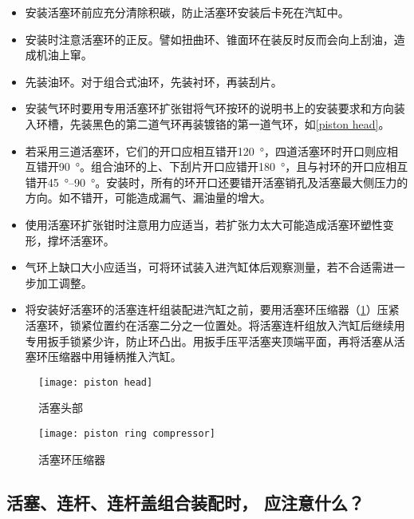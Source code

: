 \documentclass[UTF8]{ctexart}
\numberwithin{figure}{section}
\numberwithin{table}{section}
\begin{document}
\begin{itemize}
	\item 安装活塞环前应充分清除积碳，防止活塞环安装后卡死在汽缸中。

	\item 安装时注意活塞环的正反。譬如扭曲环、锥面环在装反时反而会向上刮油，造成机油上窜。

	\item 先装油环。对于组合式油环，先装衬环，再装刮片。

	\item 安装气环时要用专用活塞环扩张钳将气环按环的说明书上的安装要求和方向装入环槽，先装黑色的第二道气环再装镀铬的第一道气环，如\cref{piston head}。

	\item 若采用三道活塞环，它们的开口应相互错开\SI{120}{\degree}，四道活塞环时开口则应相互错开\SI{90}{\degree}。组合油环的上、下刮片开口应错开\SI{180}{\degree}，且与衬环的开口应相互错开\qtyrange[range-phrase = $\,\sim\,$, range-units = single]{45}{90}{\degree}。安装时，所有的环开口还要错开活塞销孔及活塞最大侧压力的方向。如不错开，可能造成漏气、漏油量的增大。

	\item 使用活塞环扩张钳时注意用力应适当，若扩张力太大可能造成活塞环塑性变形，撑坏活塞环。

	\item 气环上缺口大小应适当，可将环试装入进汽缸体后观察测量，若不合适需进一步加工调整。

	\item 将安装好活塞环的活塞连杆组装配进汽缸之前，要用活塞环压缩器（\cref{piston ring compressor}）压紧活塞环，锁紧位置约在活塞二分之一位置处。将活塞连杆组放入汽缸后继续用专用扳手锁紧少许，防止环凸出。用扳手压平活塞夹顶端平面，再将活塞从活塞环压缩器中用锤柄推入汽缸。
\end{itemize}

\begin{figure}[htbp]
	\centering
	\begin{minipage}[b]{0.6\textwidth}
		\centering
		\texttt{[image: piston head]}
		\caption{活塞头部}
		\label{piston head}
	\end{minipage}
	\begin{minipage}[b]{0.3\textwidth}
		\centering
		\texttt{[image: piston ring compressor]}
		\caption{活塞环压缩器}
		\label{piston ring compressor}
	\end{minipage}
\end{figure}

\subsection{活塞、连杆、连杆盖组合装配时， 应注意什么？}
\end{document}
